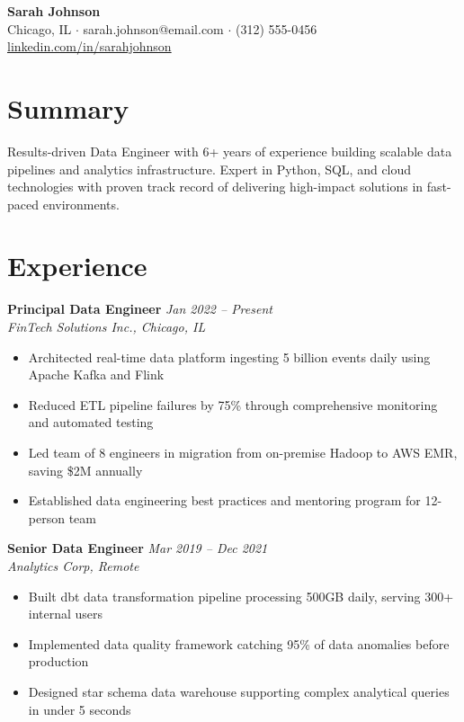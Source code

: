 \documentclass[11pt,letterpaper]{article}
\begin{document}
\begin{center}
  {\LARGE \textbf{Sarah Johnson}} \\[4pt]
  Chicago, IL $\cdot$ sarah.johnson@email.com $\cdot$ (312) 555-0456 \\
  \href{https://linkedin.com/in/sarahjohnson}{linkedin.com/in/sarahjohnson}
\end{center}

\section{Summary}

Results-driven Data Engineer with 6+ years of experience building scalable data pipelines
and analytics infrastructure. Expert in Python, SQL, and cloud technologies with proven track
record of delivering high-impact solutions in fast-paced environments.

\section{Experience}

\textbf{Principal Data Engineer} \hfill \textit{Jan 2022 -- Present} \\
\textit{FinTech Solutions Inc., Chicago, IL}
\begin{itemize}
  \item Architected real-time data platform ingesting 5 billion events daily using Apache Kafka and Flink
  \item Reduced ETL pipeline failures by 75\% through comprehensive monitoring and automated testing
  \item Led team of 8 engineers in migration from on-premise Hadoop to AWS EMR, saving \$2M annually
  \item Established data engineering best practices and mentoring program for 12-person team
\end{itemize}

\textbf{Senior Data Engineer} \hfill \textit{Mar 2019 -- Dec 2021} \\
\textit{Analytics Corp, Remote}
\begin{itemize}
  \item Built dbt data transformation pipeline processing 500GB daily, serving 300+ internal users
  \item Implemented data quality framework catching 95\% of data anomalies before production
  \item Designed star schema data warehouse supporting complex analytical queries in under 5 seconds
\end{itemize}
\end{document}
